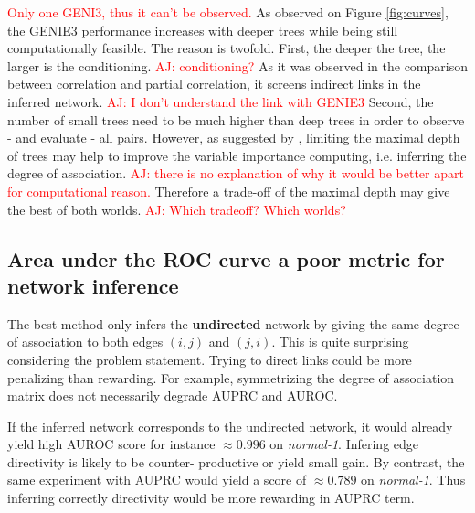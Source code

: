 \documentclass[wcp]{jmlr}
\begin{document}
\textcolor{red}{Only one GENI3, thus it can't be observed.}
As observed on Figure \ref{fig:curves}, the GENIE3 performance increases with
deeper trees while being still computationally feasible. The reason is twofold.
First, the deeper the tree, the larger is the conditioning. \textcolor{red}{AJ:
conditioning?} As it was observed in the comparison between correlation and
partial correlation, it screens indirect links in the inferred network.
\textcolor{red}{AJ: I don't understand the link with GENIE3} Second, the number
of small trees need to be much higher than deep trees in order to observe - and
evaluate - all pairs.  However, as suggested by \cite{louppe2014understanding},
limiting the maximal depth of trees may help to improve the variable importance
computing, i.e. inferring the degree of association. \textcolor{red}{AJ: there
is no explanation of why it would be better apart for computational reason.}
Therefore a trade-off  of the maximal depth may give the best of both worlds.
\textcolor{red}{AJ:  Which tradeoff? Which worlds?}



\subsection*{Area under the ROC curve a poor metric for network inference}

The best method only infers the \textbf{undirected} network by giving the same
degree of association to both edges $(i,j)$ and $(j,i)$. This is quite
surprising considering the problem statement. Trying to direct links could be
more penalizing than rewarding. For example, symmetrizing the degree of
association matrix does not necessarily degrade AUPRC and AUROC.


If the inferred network corresponds to the undirected network, it would
already yield high AUROC score for instance $\approx 0.996$ on
\textit{normal-1}. Infering edge directivity is likely to be counter-
productive or yield small gain. By contrast, the same experiment with AUPRC
would yield a score of $\approx 0.789$ on \textit{normal-1}. Thus inferring
correctly directivity would be more rewarding in AUPRC term.



\end{document}
